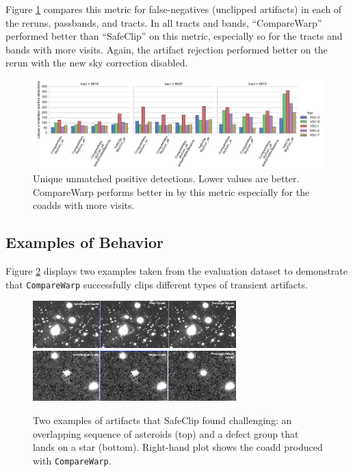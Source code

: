 \documentclass[DM,authoryear,toc]{lsstdoc}
\begin{document}
Figure \ref{fig:uniquePosDet} compares this metric for false-negatives (unclipped artifacts) in each of the reruns, passbands, and tracts.
In all tracts and bands, ``CompareWarp'' performed better than ``SafeClip'' on this metric, especially so for the tracts and bands with more visits.
Again, the artifact rejection performed better on the rerun with the new sky correction disabled.

\begin{figure}
\begin{centering}
\includegraphics[width=1.0\textwidth]{figures/missed_uniquePosDet.pdf}
\par\end{centering}
\caption{\label{fig:uniquePosDet} Unique unmatched positive detections. Lower values are better. CompareWarp performs better in by this metric especially for the coadds with more visits.}
\end{figure}

\subsection{Examples of Behavior}
Figure \ref{fig:old_examples} displays two examples taken from the evaluation dataset to demonstrate that \texttt{CompareWarp} successfully clips different types of transient artifacts.

\begin{figure}
\begin{centering}
\includegraphics[width=0.7\textwidth]{figures/prototypeRobustAsteroids.png}
\includegraphics[width=0.7\textwidth]{figures/PrototypeRobustDetect1.png}
\par\end{centering}
\caption{\label{fig:old_examples} Two examples of artifacts that SafeClip found challenging: an overlapping sequence of asteroids (top) and a defect group that lands on a star (bottom).  Right-hand plot shows the coadd produced with \texttt{CompareWarp}.}
\end{figure}
\end{document}
